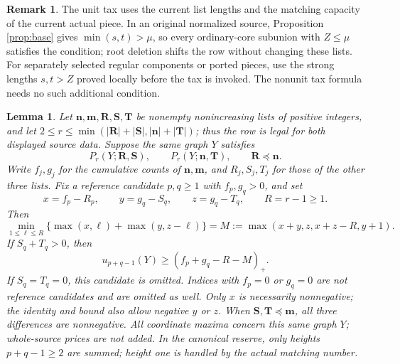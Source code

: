\documentclass[11pt,a4paper]{article}
\newtheorem{lemma}[theorem]{Lemma}
\theoremstyle{definition}
\newtheorem{remark}[theorem]{Remark}
\begin{document}
\begin{remark}\label{rem:unit-tax-scope}
The unit tax uses the current list lengths and the matching capacity of the current actual piece. In an original normalized source, Proposition \ref{prop:base} gives $\min(s,t)>\mu$, so every ordinary-core subunion with $Z\le\mu$ satisfies the condition; root deletion shifts the row without changing these lists. For separately selected regular components or ported pieces, use the strong lengths $s,t>Z$ proved locally before the tax is invoked. The nonunit tax formula needs no such additional condition.
\end{remark}
\begin{lemma}\label{lem:allowance-tax}
Let $\mathbf n,\mathbf m,\mathbf R,\mathbf S,\mathbf T$ be nonempty
nonincreasing lists of positive integers, and let
$2\le r\le\min(|\mathbf R|+|\mathbf S|,|\mathbf n|+|\mathbf T|)$;
thus the row is legal for both displayed source data.
Suppose the same graph $Y$ satisfies
\[
 P_r(Y;\mathbf R,\mathbf S),\qquad
 P_r(Y;\mathbf n,\mathbf T),\qquad \mathbf R\preceq\mathbf n.
\]
Write $f_j,g_j$ for the cumulative counts of $\mathbf n,\mathbf m$,
and $R_j,S_j,T_j$ for those of the other three lists.
Fix a reference candidate $p,q\ge1$ with $f_p,g_q>0$, and set
\[
 x=f_p-R_p,\qquad y=g_q-S_q,\qquad z=g_q-T_q,
 \qquad R=r-1\ge1.
\]
Then
\[
 \min_{1\le\ell\le R}
 \{\max(x,\ell)+\max(y,z-\ell)\}
 =M:=\max(x+y,z,x+z-R,y+1).
\]
If $S_q+T_q>0$, then
\[
 u_{p+q-1}(Y)\ge(f_p+g_q-R-M)_+.
\]
If $S_q=T_q=0$, this candidate is omitted.
Indices with $f_p=0$ or $g_q=0$ are not reference candidates and are
omitted as well.
Only $x$ is necessarily nonnegative; the identity and bound also allow
negative $y$ or $z$. When $\mathbf S,\mathbf T\preceq\mathbf m$,
all three differences are nonnegative.
All coordinate maxima concern this same graph $Y$; whole-source prices
are not added. In the canonical reserve, only heights $p+q-1\ge2$
are summed; height one is handled by the actual matching number.
\end{lemma}
\end{document}
